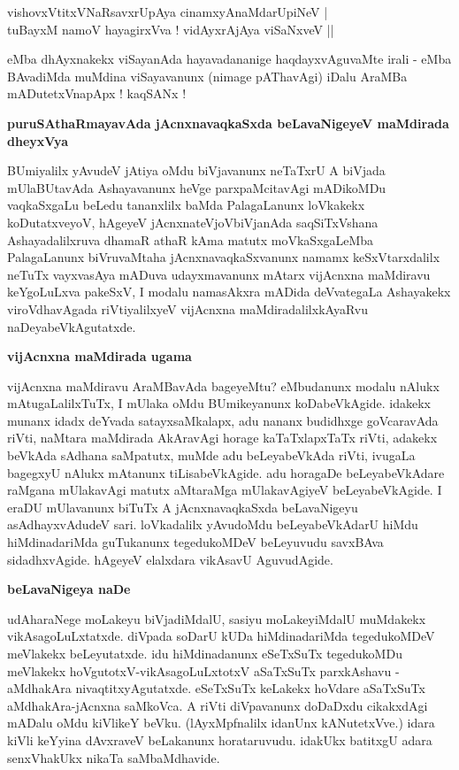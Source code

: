 \begin{shloka}
vishovxVtitxVNaRsavxrUpAya cinamxyAnaMdarUpiNeV |\\\label{65}
tuBayxM namoV hayagirxVva ! vidAyxrAjAya viSaNxveV ||
\end{shloka}

\noindent
eMba dhAyxnakekx viSayanAda hayavadananige haqdayxvAguvaMte irali - eMba BAvadiMda muMdina viSayavanunx (nimage pAThavAgi) iDalu AraMBa mADutetxVnapApx ! kaqSANx !

{\bigskip
\noindent
{\large\bf puruSAthaRmayavAda jAcnxnavaqkaSxda beLavaNigeyeV maMdirada dheyxVya}}\label{page65}
\medskip

\noindent
BUmiyalilx yAvudeV jAtiya oMdu biVjavanunx neTaTxrU A biVjada mUla\-BUtavAda Ashaya\-vanunx heVge parxpaMcitavAgi mADikoMDu vaqkaSxgaLu beLedu tananxlilx baMda PalagaLanunx loVkakekx koDu\-tatxveyoV, hAgeyeV jAcnxnateVjoVbiVjanAda saqSiTxVshana Ashayadalilxruva dhamaR athaR kAma matutx moVkaSxgaLeMba Pala\-gaLanunx biVruvaMtaha jAcnxnavaqkaSxvanunx namamx keSxVtarxdalilx neTuTx vayxvasAya mADuva udayx\-ma\-vanunx mAtarx vijAcnxna maMdiravu keYgoLuLxva pakeSxV, I modalu namasAkxra \hbox{mADida} deVvategaLa Ashayakekx viroVdha\-vAgada riVtiyalilxyeV vijAcnxna maMdiradalilx\break \hbox{kAyaRvu} naDeyabeVkAgutatxde.

{\bigskip
\noindent
{\large\bf vijAcnxna maMdirada ugama}}
\medskip

\noindent
vijAcnxna maMdiravu AraMBavAda bageyeMtu? eMbudanunx modalu nAlukx mAtu\-gaLa\-lilxTuTx, I mU\-laka oMdu BUmikeyanunx koDabeVkAgide. idakekx munanx idadx deYvada satayx\-saMkalapx, adu nananx budidhxge\- goVcara\-vAda riVti, naMtara maMdirada AkAravAgi horage kaTaTxlapxTaTx riVti, adakekx beVkAda sAdhana saM\-patutx, muMde adu beLeyabeVkAda riVti, ivugaLa bagegxyU nAlukx mAtanunx tiLisabeVkAgide. adu horagaDe beLeyabeVkAdare raMgana mUlakavAgi matutx aMta\-raMga mUlakavAgiyeV beLeyabeVkAgide. I eraDU mUlavanunx biTuTx A jAcnxnavaqkaSxda beLavaNigeyu asAdhayxvAdudeV sari. loVkadalilx yAvu\-doMdu beLeyabeVkAdarU hiMdu hiMdinadariMda guTukanunx tegedukoMDeV beLeyuvudu savxBAva sidadhxvAgide. hAgeyeV elalx\-dara vikAsavU AguvudAgide.

{\bigskip
\noindent
{\large\bf beLavaNigeya naDe}}\label{page66}
\medskip

\noindent
udAharaNege moLakeyu biVjadiMdalU, sasiyu moLakeyiMdalU muMdakekx vikAsa\-goLuLxtatxde. diV\-pada soDarU kUDa hiMdinadariMda tegedukoMDeV meVlakekx beLeyutatxde. idu hiMdinadanunx eSeTx\-SuTx tegedukoMDu meVlakekx hoVgutotxV-vikAsagoLuLxtotxV aSaTxSuTx parxkAshavu - aMdhakAra nivaqtitx\-yAgutatxde. eSeTxSuTx keLakekx hoVdare aSaTxSuTx aMdhakAra-jAcnxna saMkoVca. A riVti diVpavanunx doDaDxdu cikakx\-dAgi mA\-Dalu oMdu kiVlikeY beVku. (lAyxMpfnalilx idanUnx kANutetxVve.) idara kiVli keYyina dAvxraveV beLakanunx horataruvudu. idakUkx batitxgU adara senxVhakUkx nikaTa saMbaMdhavide.

